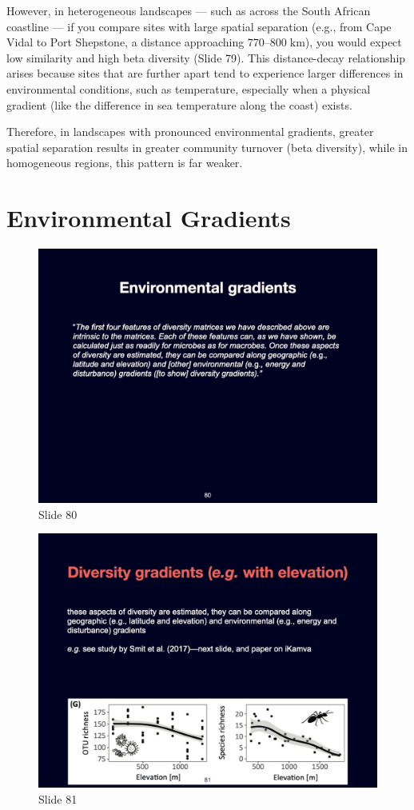 \documentclass[
  11pt,
]{book}
\begin{document}
However, in heterogeneous landscapes --- such as across the South
African coastline --- if you compare sites with large spatial separation
(e.g., from Cape Vidal to Port Shepstone, a distance approaching
\(770\)--\(800\;\mathrm{km}\)), you would expect low similarity and high
beta diversity (Slide 79). This distance-decay relationship arises
because sites that are further apart tend to experience larger
differences in environmental conditions, such as temperature, especially
when a physical gradient (like the difference in sea temperature along
the coast) exists.

Therefore, in landscapes with pronounced environmental gradients,
greater spatial separation results in greater community turnover (beta
diversity), while in homogeneous regions, this pattern is far weaker.

\section{Environmental Gradients}\label{environmental-gradients-2}

\begin{figure}[ht]
\centering
\includegraphics[width=0.8\linewidth]{../images/BDC334/BDC334-080.jpeg}
\caption*{Slide 80}
\end{figure}

\begin{figure}[ht]
\centering
\includegraphics[width=0.8\linewidth]{../images/BDC334/BDC334-081.jpeg}
\caption*{Slide 81}
\end{figure}
\end{document}
